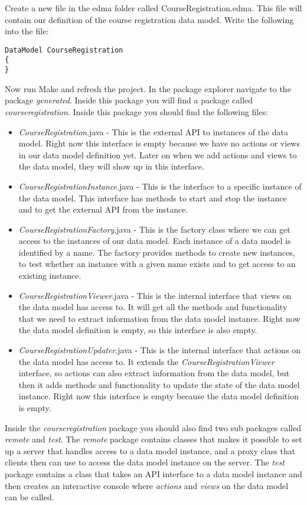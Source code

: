 Create a new file in the edma folder called CourseRegistration.edma.
This file will contain our definition of the course registration data
model. Write the following into the file:

\begin{lstlisting}[basicstyle={\scriptsize}]
DataModel CourseRegistration
{
}
\end{lstlisting}


Now run Make and refresh the project. In the package explorer navigate
to the package \emph{generated}. Inside this package you will find
a package called \emph{courseregistration}. Inside this package you
should find the following files: 
\begin{itemize}
\item \emph{CourseRegistration}.java - This is the external API to instances
of the data model. Right now this interface is empty because we have
no actions or views in our data model definition yet. Later on when
we add actions and views to the data model, they will show up in this
interface.
\item \emph{CourseRegistrationInstance}.java - This is the interface to
a specific instance of the data model. This interface has methods
to start and stop the instance and to get the external API from the
instance.
\item \emph{CourseRegistrationFactory}.java - This is the factory class
where we can get access to the instances of our data model. Each instance
of a data model is identified by a name. The factory provides methods
to create new instances, to test whether an instance with a given
name exists and to get access to an existing instance.
\item \emph{CourseRegistrationViewer}.java - This is the internal interface
that views on the data model has access to. It will get all the methods
and functionality that we need to extract information from the data
model instance. Right now the data model definition is empty, so this
interface is also empty.
\item \emph{CourseRegistrationUpdater}.java - This is the internal interface
that actions on the data model has access to. It extends the \emph{CourseRegistrationViewer}
interface, so actions can also extract information from the data model,
but then it adds methods and functionality to update the state of
the data model instance. Right now this interface is empty because
the data model definition is empty.
\end{itemize}
Inside the \emph{courseregistration }package you should also find
two sub packages called \emph{remote} and \emph{test}. The \emph{remote}
package contains classes that makes it possible to set up a server
that handles access to a data model instance, and a proxy class that
clients then can use to access the data model instance on the server.
The \emph{test} package contains a class that takes an API interface
to a data model instance and then creates an interactive console where
\emph{actions} and \emph{views} on the data model can be called.

